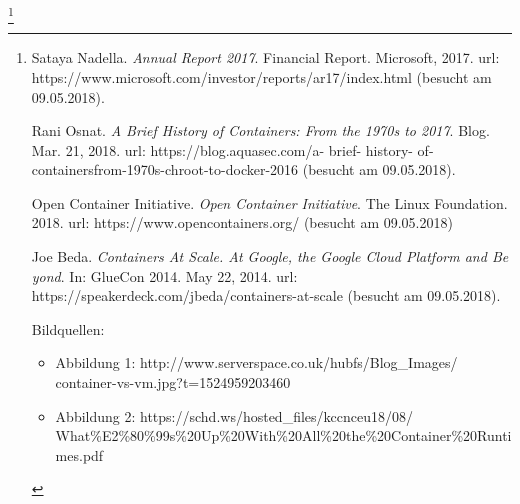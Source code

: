 \let\thefootnote\relax\footnote{
{
\vspace{0.1mm}
\begin{minipage}[t]{\linewidth}
 \begin{list}{\textcolor{black}{[]}}{\setlength{\labelwidth}{2cm}\setlength{\leftmargin}{0.5cm}\setlength{\itemsep}{-1mm}}\item Sataya Nadella. \textit{Annual Report 2017}. Financial Report. Microsoft, 2017. url: https://www.microsoft.com/investor/reports/ar17/index.html (besucht am 09.05.2018).
\item Rani Osnat. \textit{A Brief History of Containers: From the 1970s to 2017}. Blog. Mar. 21, 2018. url: https://blog.aquasec.com/a- brief- history- of- containersfrom-1970s-chroot-to-docker-2016 (besucht am 09.05.2018).
\item Open Container Initiative. \textit{Open Container Initiative}. The Linux Foundation. 2018. url: https://www.opencontainers.org/ (besucht am 09.05.2018)
\item Joe Beda. \textit{Containers At Scale. At Google, the Google Cloud Platform and Be
yond}. In: GlueCon 2014. May 22, 2014. url: https://speakerdeck.com/jbeda/containers-at-scale (besucht am 09.05.2018).
\end{list}
Bildquellen:
\begin{itemize}
\item Abbildung 1: http://www.serverspace.co.uk/hubfs/Blog\_Images/ \\ container-vs-vm.jpg?t=1524959203460
\item Abbildung 2: https://schd.ws/hosted\_files/kccnceu18/08/ \\ What\%E2\%80\%99s\%20Up\%20With\%20All\%20the\%20Container\%20Runtimes.pdf
\end{itemize}
\end{minipage}
}}
\newpage










